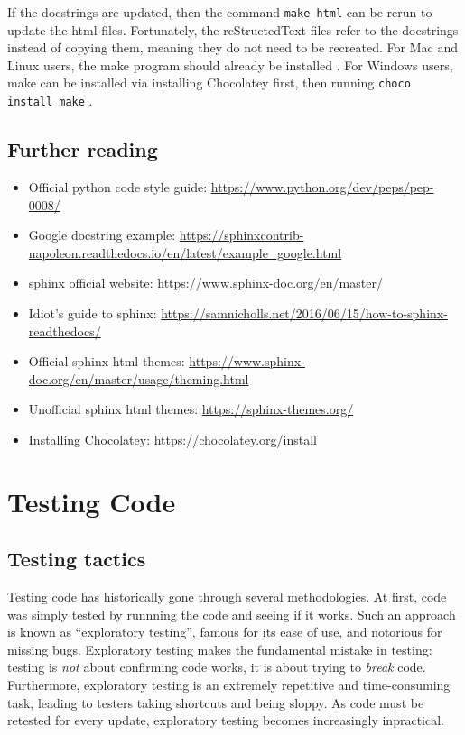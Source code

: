 \documentclass[11pt]{article}
\begin{document}
If the \glspl{docstring} are updated, then the command \texttt{make html} can be rerun to update the \acrshort{html} files. Fortunately, the reStructedText files refer to the \glspl{docstring} instead of copying them, meaning they do not need to be recreated. For Mac and Linux \gls{user}s, the \Gls{make} program should already be installed \cite{makefile}. For Windows users, \Gls{make} can be installed via installing Chocolatey first, then running \texttt{choco install make} \cite{chocolatey}.

\subsection{Further reading}

\begin{itemize}
    \item Official \Gls{python} code style guide: \url{https://www.python.org/dev/peps/pep-0008/}
    \item Google docstring example: \url{https://sphinxcontrib-napoleon.readthedocs.io/en/latest/example_google.html}
    \item \Gls{sphinx} official website: \url{https://www.sphinx-doc.org/en/master/}
    \item Idiot's guide to \Gls{sphinx}: \url{https://samnicholls.net/2016/06/15/how-to-sphinx-readthedocs/}
    \item Official \Gls{sphinx} \acrshort{html} themes: \url{https://www.sphinx-doc.org/en/master/usage/theming.html}
    \item Unofficial \Gls{sphinx} \acrshort{html} themes: \url{https://sphinx-themes.org/}
    \item Installing Chocolatey: \url{https://chocolatey.org/install}
\end{itemize}

\newpage

\section{Testing Code}

\subsection{Testing tactics}

Testing code has historically gone through several methodologies. At first, code was simply tested by runnning the code and seeing if it works. Such an approach is known as ``exploratory testing'', famous for its ease of use, and notorious for missing bugs. Exploratory testing makes the fundamental mistake in testing: testing is \textit{not} about confirming code works, it is about trying to \textit{break} code. Furthermore, exploratory testing is an extremely repetitive and time-consuming task, leading to testers taking shortcuts and being sloppy. As code must be retested for every update, exploratory testing becomes increasingly inpractical.
\end{document}
